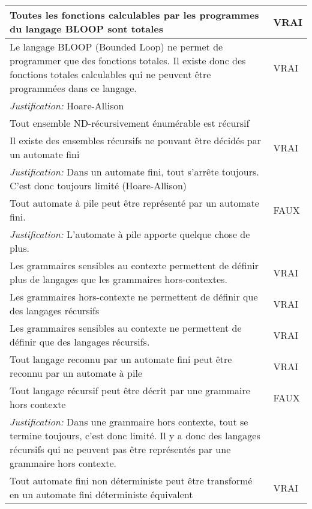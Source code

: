 \begin{longtable}{p{13cm}|l}
    Toutes les fonctions calculables par les programmes du langage BLOOP sont totales & VRAI \\
    \hline
    Le langage BLOOP (Bounded Loop) ne permet de programmer que des fonctions totales. Il existe donc des fonctions totales calculables qui ne peuvent être programmées dans ce langage. & VRAI \\
    \textit{Justification:} Hoare-Allison & \\
     \hline
    Tout ensemble ND-récursivement énumérable est récursif& \\
     \hline
    Il existe des ensembles récursifs ne pouvant être décidés par un automate fini & VRAI \\
    \textit{Justification:} Dans un automate fini, tout s'arrête toujours. C'est donc toujours limité (Hoare-Allison) & \\
     \hline
    Tout automate à pile peut être représenté par un automate fini.& FAUX\\
    \textit{Justification:} L'automate à pile apporte quelque chose de plus. & \\
     \hline
    Les grammaires sensibles au contexte permettent de définir plus de langages que les grammaires hors-contextes.& VRAI\\
     \hline
    Les grammaires hors-contexte ne permettent de définir que des langages récursifs& VRAI\\
     \hline
    Les grammaires sensibles au contexte ne permettent de définir que des langages récursifs. & VRAI \\
     \hline
    Tout langage reconnu par un automate fini peut être reconnu par un automate à pile & VRAI \\
     \hline
    Tout langage récursif peut être décrit par une grammaire hors contexte & FAUX \\
    \textit{Justification:} Dans une grammaire hors contexte, tout se termine toujours, c’est donc limité. Il y a donc des langages récursifs qui ne peuvent pas être représentés par une grammaire hors contexte. & \\
     \hline
    Tout automate fini non déterministe peut être transformé en un automate fini déterministe équivalent & VRAI \\

\end{longtable}
